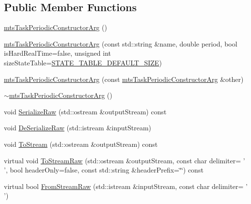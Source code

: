 \subsection*{Public Member Functions}
\begin{DoxyCompactItemize}
\item 
\hyperlink{classmts_task_periodic_constructor_arg_a859ff291bf47192285f9ab515ce03056}{mts\-Task\-Periodic\-Constructor\-Arg} ()
\item 
\hyperlink{classmts_task_periodic_constructor_arg_aab112f4d4f81df67d60dd9283bfd6374}{mts\-Task\-Periodic\-Constructor\-Arg} (const std\-::string \&name, double period, bool is\-Hard\-Real\-Time=false, unsigned int size\-State\-Table=\hyperlink{classmts_task_periodic_constructor_arg_a9c81cd0ff169c6afedc5cf3e69f181a9a636d05314de683eba7b7c31f0627f5cb}{S\-T\-A\-T\-E\-\_\-\-T\-A\-B\-L\-E\-\_\-\-D\-E\-F\-A\-U\-L\-T\-\_\-\-S\-I\-Z\-E})
\item 
\hyperlink{classmts_task_periodic_constructor_arg_aa42f9007a3d15d0d6c37d6129149d405}{mts\-Task\-Periodic\-Constructor\-Arg} (const \hyperlink{classmts_task_periodic_constructor_arg}{mts\-Task\-Periodic\-Constructor\-Arg} \&other)
\item 
\hyperlink{classmts_task_periodic_constructor_arg_afe25fce7a682ee2a4be36cd63249e8b9}{$\sim$mts\-Task\-Periodic\-Constructor\-Arg} ()
\item 
void \hyperlink{classmts_task_periodic_constructor_arg_accdba07a3168373637092903d6c415fd}{Serialize\-Raw} (std\-::ostream \&output\-Stream) const 
\item 
void \hyperlink{classmts_task_periodic_constructor_arg_a42a52417233307de92b780e9f9beaf7f}{De\-Serialize\-Raw} (std\-::istream \&input\-Stream)
\item 
void \hyperlink{classmts_task_periodic_constructor_arg_addfcb27fe5ad37e6c1ab6dad37b7e120}{To\-Stream} (std\-::ostream \&output\-Stream) const 
\item 
virtual void \hyperlink{classmts_task_periodic_constructor_arg_a4820a784c730fdb160090b77675485e8}{To\-Stream\-Raw} (std\-::ostream \&output\-Stream, const char delimiter= ' ', bool header\-Only=false, const std\-::string \&header\-Prefix=\char`\"{}\char`\"{}) const 
\item 
virtual bool \hyperlink{classmts_task_periodic_constructor_arg_a95bf0bdf04e064a9c94246948c895ed2}{From\-Stream\-Raw} (std\-::istream \&input\-Stream, const char delimiter= ' ')
\end{DoxyCompactItemize}
